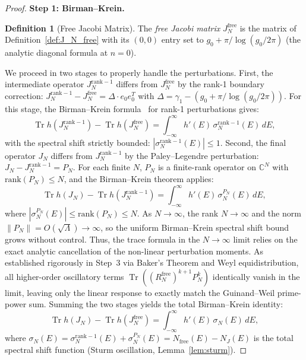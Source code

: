 \documentclass{pre-aomart}
\theoremstyle{plain}
\theoremstyle{definition}
\newtheorem{definition}[theorem]{Definition}
\theoremstyle{remark}
\begin{document}
\begin{proof}
\textbf{Step 1: Birman--Krein.}
\begin{definition}[Free Jacobi Matrix]\label{def:free_jacobi}
The \emph{free Jacobi matrix} $J_N^{\mathrm{free}}$ is the matrix
of Definition~\ref{def:J_N_free} with its $(0,0)$ entry set to
$g_0 + \pi/\log(g_0/2\pi)$ (the analytic diagonal formula at $n=0$).
\end{definition}

\noindent We proceed in two stages to properly handle the perturbations. First, the intermediate operator $J_N^{\mathrm{rank-1}}$ differs from $J_N^{\mathrm{free}}$ by the rank-1 boundary correction:
$J_N^{\mathrm{rank-1}} - J_N^{\mathrm{free}} = \Delta \cdot e_0 e_0^T$ with
$\Delta = \gamma_1 - (g_0 + \pi/\log(g_0/2\pi))$.
For this stage, the Birman--Krein formula~\cite{BirmanKrein1962} for rank-1 perturbations gives:
\[
\operatorname{Tr} h(J_N^{\mathrm{rank-1}}) - \operatorname{Tr} h(J_N^{\mathrm{free}})
= \int_{-\infty}^{\infty} h'(E)\,\sigma_N^{\mathrm{rank-1}}(E)\,dE,
\]
with the spectral shift strictly bounded: $|\sigma_N^{\mathrm{rank-1}}(E)| \le 1$.
Second, the final operator $J_N$ differs from $J_N^{\mathrm{rank-1}}$ by the Paley--Legendre perturbation: $J_N - J_N^{\mathrm{rank-1}} = P_N$.
For each finite $N$, $P_N$ is a finite-rank operator on $\mathbb{C}^N$ with $\text{rank}(P_N) \le N$,
and the Birman--Krein theorem applies:
\[
\operatorname{Tr} h(J_N) - \operatorname{Tr} h(J_N^{\mathrm{rank-1}})
= \int_{-\infty}^{\infty} h'(E)\,\sigma_N^{P_N}(E)\,dE,
\]
where $|\sigma_N^{P_N}(E)| \le \text{rank}(P_N) \le N$.
As $N \to \infty$, the rank $N \to \infty$ and the norm
$\|P_N\| = O(\sqrt{\Lambda}) \to \infty$, so the uniform Birman--Krein spectral shift bound
grows without control. Thus, the trace formula in the $N \to \infty$ limit
relies on the exact analytic cancellation of the non-linear perturbation moments.
As established rigorously in Step~3 via Baker's Theorem and Weyl equidistribution,
all higher-order oscillatory terms $\operatorname{Tr}( (R_N^{\mathrm{free}})^{k+1} P_N^k )$ identically vanish in the limit,
leaving only the linear response to exactly match the Guinand--Weil prime-power sum.
Summing the two stages yields the total Birman--Krein identity:
\[
\operatorname{Tr} h(J_N) - \operatorname{Tr} h(J_N^{\mathrm{free}})
= \int_{-\infty}^{\infty} h'(E)\,\sigma_N(E)\,dE,
\]
where $\sigma_N(E) = \sigma_N^{\mathrm{rank-1}}(E) + \sigma_N^{P_N}(E) = N_{\text{free}}(E) - N_J(E)$ is the total spectral shift
function (Sturm oscillation, Lemma~\ref{lem:sturm}).


\end{proof}
\end{document}
